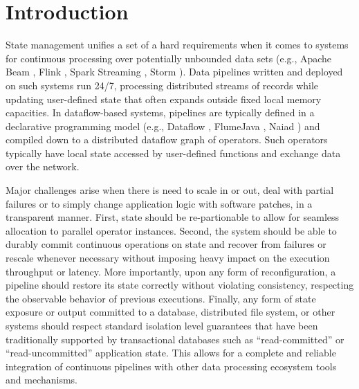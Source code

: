 
\section{Introduction}
\label{sec:intro}

State management unifies a set of a hard requirements when it comes to systems for continuous processing over potentially unbounded data sets (e.g., Apache Beam \cite{CUSTOM:web/beam}, Flink \cite{carbone2015flink}, Spark Streaming \cite{zaharia2012discretized}, Storm \cite{CUSTOM:web/Storm}). Data pipelines written and deployed on such systems run 24/7, processing distributed streams of records while updating user-defined state that often expands outside fixed local memory capacities. In dataflow-based systems, pipelines are typically defined in a declarative programming model (e.g., Dataflow \cite{akidau2015dataflow}, FlumeJava \cite{chambers2010flumejava}, Naiad \cite{murray2013naiad}) and compiled down to a distributed dataflow graph of operators. Such operators typically have local state accessed by user-defined functions and exchange data over the network. 

Major challenges arise when there is need to scale in or out, deal with partial failures or to simply change application logic with software patches, in a transparent manner. First, state should be  re-partionable to allow for seamless allocation to parallel operator instances. Second, the system should be able to durably commit continuous operations on state and recover from failures or rescale whenever necessary without imposing heavy impact on the execution throughput or latency. More importantly, upon any form of reconfiguration, a pipeline should restore its state correctly without violating consistency, respecting the observable behavior of previous executions. Finally, any form of state exposure or output committed to a database, distributed file system, or other systems should respect standard isolation level guarantees that have been traditionally supported by transactional databases such as ``read-committed'' or ``read-uncommitted'' application state. This allows for a complete and reliable integration of continuous pipelines with other data processing ecosystem tools and mechanisms.


